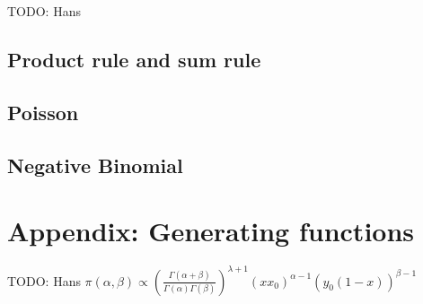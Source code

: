 \documentclass[11pt]{article}
\begin{document}
TODO: Hans

\subsection{Product rule and sum rule}

\subsection{Poisson}

\subsection{Negative Binomial}

\section{Appendix: Generating functions}

TODO: Hans
$\pi(\alpha, \beta) \propto \left( \frac{\Gamma(\alpha+\beta)}{\Gamma(\alpha) \Gamma(\beta)} \right)^{\lambda +1} (x x_0)^{\alpha-1} \left(y_0 (1-x) \right)^{\beta-1}$






\end{document}
